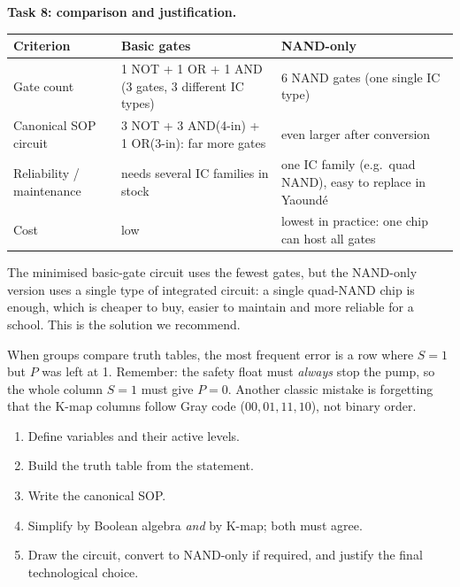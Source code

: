 \documentclass[11pt]{article}
\begin{document}
\textbf{Task 8: comparison and justification.}\par
\begin{center}
\begin{tabularx}{\linewidth}{|l|X|X|}
\hline
\rowcolor{popblueL} \textbf{Criterion} & \textbf{Basic gates} & \textbf{NAND-only} \\
\hline
Gate count & 1 NOT + 1 OR + 1 AND (3 gates, 3 different IC types) & 6 NAND gates (one single IC type) \\
\hline
Canonical SOP circuit & 3 NOT + 3 AND(4-in) + 1 OR(3-in): far more gates & even larger after conversion \\
\hline
Reliability / maintenance & needs several IC families in stock & one IC family (e.g.\ quad NAND), easy to replace in Yaoundé \\
\hline
Cost & low & lowest in practice: one chip can host all gates \\
\hline
\end{tabularx}
\end{center}
The minimised basic-gate circuit uses the fewest gates, but the NAND-only version uses a single type of integrated circuit: a single quad-NAND chip is enough, which is cheaper to buy, easier to maintain and more reliable for a school. This is the solution we recommend.

\begin{attention}
When groups compare truth tables, the most frequent error is a row where $S=1$ but $P$ was left at 1. Remember: the safety float must \emph{always} stop the pump, so the whole column $S=1$ must give $P=0$. Another classic mistake is forgetting that the K-map columns follow Gray code ($00, 01, 11, 10$), not binary order.
\end{attention}

\begin{aretenir}
\begin{enumerate}
\item Define variables and their active levels.
\item Build the truth table from the statement.
\item Write the canonical SOP.
\item Simplify by Boolean algebra \emph{and} by K-map; both must agree.
\item Draw the circuit, convert to NAND-only if required, and justify the final technological choice.
\end{enumerate}
\end{aretenir}
\end{document}
